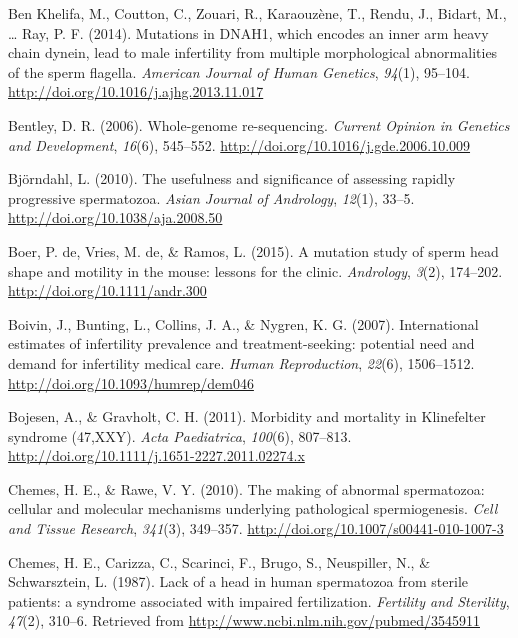\documentclass[12pt,twoside]{reedthesis}
\theoremstyle{definition}
\theoremstyle{definition}
\theoremstyle{remark}
\begin{document}
  \hypertarget{ref-BenKhelifa2014}{}
  Ben Khelifa, M., Coutton, C., Zouari, R., Karaouzène, T., Rendu, J.,
  Bidart, M., \ldots{} Ray, P. F. (2014). Mutations in DNAH1, which
  encodes an inner arm heavy chain dynein, lead to male infertility from
  multiple morphological abnormalities of the sperm flagella.
  \emph{American Journal of Human Genetics}, \emph{94}(1), 95--104.
  \url{http://doi.org/10.1016/j.ajhg.2013.11.017}
  
  \hypertarget{ref-Bentley2006}{}
  Bentley, D. R. (2006). Whole-genome re-sequencing. \emph{Current Opinion
  in Genetics and Development}, \emph{16}(6), 545--552.
  \url{http://doi.org/10.1016/j.gde.2006.10.009}
  
  \hypertarget{ref-Bjorndahl2010}{}
  Björndahl, L. (2010). The usefulness and significance of assessing
  rapidly progressive spermatozoa. \emph{Asian Journal of Andrology},
  \emph{12}(1), 33--5. \url{http://doi.org/10.1038/aja.2008.50}
  
  \hypertarget{ref-DeBoer2015}{}
  Boer, P. de, Vries, M. de, \& Ramos, L. (2015). A mutation study of
  sperm head shape and motility in the mouse: lessons for the clinic.
  \emph{Andrology}, \emph{3}(2), 174--202.
  \url{http://doi.org/10.1111/andr.300}
  
  \hypertarget{ref-Boivin2007a}{}
  Boivin, J., Bunting, L., Collins, J. A., \& Nygren, K. G. (2007).
  International estimates of infertility prevalence and treatment-seeking:
  potential need and demand for infertility medical care. \emph{Human
  Reproduction}, \emph{22}(6), 1506--1512.
  \url{http://doi.org/10.1093/humrep/dem046}
  
  \hypertarget{ref-Bojesen2011}{}
  Bojesen, A., \& Gravholt, C. H. (2011). Morbidity and mortality in
  Klinefelter syndrome (47,XXY). \emph{Acta Paediatrica}, \emph{100}(6),
  807--813. \url{http://doi.org/10.1111/j.1651-2227.2011.02274.x}
  
  \hypertarget{ref-Chemes2010}{}
  Chemes, H. E., \& Rawe, V. Y. (2010). The making of abnormal
  spermatozoa: cellular and molecular mechanisms underlying pathological
  spermiogenesis. \emph{Cell and Tissue Research}, \emph{341}(3),
  349--357. \url{http://doi.org/10.1007/s00441-010-1007-3}
  
  \hypertarget{ref-Chemes1987}{}
  Chemes, H. E., Carizza, C., Scarinci, F., Brugo, S., Neuspiller, N., \&
  Schwarsztein, L. (1987). Lack of a head in human spermatozoa from
  sterile patients: a syndrome associated with impaired fertilization.
  \emph{Fertility and Sterility}, \emph{47}(2), 310--6. Retrieved from
  \url{http://www.ncbi.nlm.nih.gov/pubmed/3545911}
  
\end{document}
